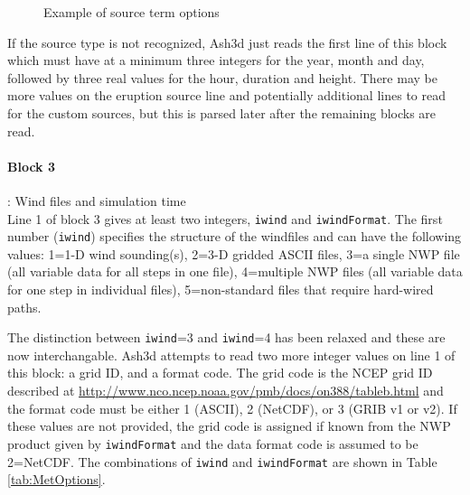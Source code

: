 \begin{figure}[htbp]
\parbox{15cm}{\caption{\label{FigSourceOptions}
Example of source term options}}
\end{figure}
If the source type is not recognized, Ash3d just reads the first line of this
block which must have at a minimum three integers for the year, month and day,
followed by three real values for the hour, duration and height.  There may
be more values on the eruption source line and potentially additional lines to
read for the custom sources, but this is parsed later after the remaining blocks
are read.

\paragraph{Block 3}: Wind files and simulation time\\
Line 1 of block 3 gives at least two integers, \texttt{iwind} and \texttt{iwindFormat}.
The first number (\texttt{iwind}) specifies the structure of the windfiles and can
have the following values:
1=1-D wind sounding(s),
2=3-D gridded ASCII files,
3=a single NWP file (all variable data for all steps in one file),
4=multiple NWP files (all variable data for one step in individual files),
5=non-standard files that require hard-wired paths.

The distinction between \texttt{iwind}=3 and \texttt{iwind}=4 has been
relaxed and these are now interchangable.
Ash3d attempts to read two more integer values on line 1
of this block: a grid ID, and a format code.  The grid code is the NCEP grid
ID described at \url{http://www.nco.ncep.noaa.gov/pmb/docs/on388/tableb.html}
and the format code must be either 1 (ASCII), 2 (NetCDF), or 3 (GRIB v1 or v2).
If these values are not provided, the grid code is assigned if known from the
NWP product given by \texttt{iwindFormat} and the data format code is assumed to
be 2=NetCDF.  The combinations of \texttt{iwind} and \texttt{iwindFormat} are shown in
Table \ref{tab:MetOptions}.

